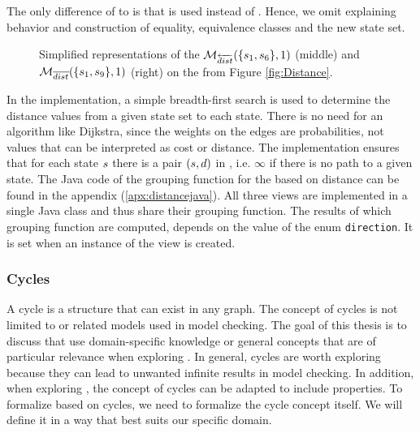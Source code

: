 \documentclass[preview]{standalone}
\begin{document}
The only difference of \viewdistancebi to \viewdistance is that \distpathbi is used instead of \distpath. Hence, we omit explaining behavior and construction of equality, equivalence classes and the new state set.

\begin{figure}[!htb]
	\begin{minipage}{.5\textwidth}
		\hspace{15mm}		
		\centering 
	\end{minipage}%
	\begin{minipage}{.5\textwidth}
		\hspace{10mm}		
		\centering 
	\end{minipage}	
	\caption{Simplified representations of the \viewsN $\viewdistancerev(\{\state_1, \state_6\}, 1)$ (middle) and ${{{{{\mathcal{M}}}}_{{{\overline{dist}}}}}}(\{{s}_1, {s}_9\}, 1)$ (right) on the \chgph from Figure \ref{fig:Distance}.} 
	\label{fig:DistanceRevBi} 
\end{figure}

In the implementation, a simple breadth-first search is used to determine the distance values from a given state set to each state. There is no need for an algorithm like Dijkstra, since the weights on the edges are probabilities, not values that can be interpreted as cost or distance. The implementation ensures that for each state ${s}$ there is a pair $({s}, {d})$ in \fctdistdefault, i.e. $\infty$ if there is no path to a given state. The Java code of the grouping function for the \viewsN based on distance can be found in the appendix (\ref{apx:distancejava}). All three views are implemented in a single Java class and thus share their grouping function. The results of which grouping function are computed, depends on the value of the enum \texttt{direction}. It is set when an instance of the view is created.

\pagebreak

\subsubsection{Cycles}
A cycle is a structure that can exist in any graph. The concept of cycles is not limited to \chgphsN or related models used in model checking. The goal of this thesis is to discuss \viewsN that use domain-specific knowledge or general concepts that are of particular relevance when exploring \achgphN. In general, cycles are worth exploring because they can lead to unwanted infinite results in model checking. In addition, when exploring \viewsN, the concept of cycles can be adapted to include \mdpsN properties. To formalize \viewsN based on cycles, we need to formalize the cycle concept itself. We will define it in a way that best suits our specific domain.
\end{document}
